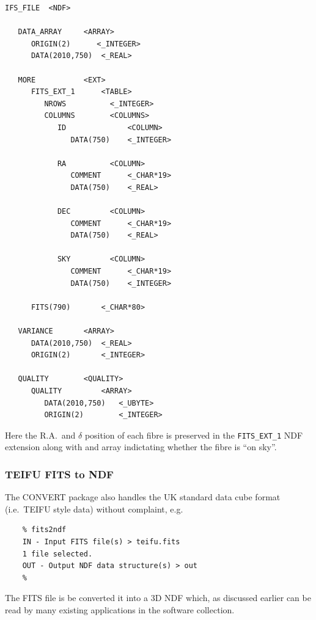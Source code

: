 \documentclass[twoside,11pt]{article}
\newcommand{\htmlref}[2]{#1}
\newcommand{\xref}[3]{#1}
\begin{document}
\small\begin{verbatim}
IFS_FILE  <NDF>

   DATA_ARRAY     <ARRAY>          
      ORIGIN(2)      <_INTEGER>  
      DATA(2010,750)  <_REAL> 

   MORE           <EXT>           
      FITS_EXT_1      <TABLE>         
         NROWS          <_INTEGER>    
         COLUMNS        <COLUMNS>      
            ID              <COLUMN>        
               DATA(750)    <_INTEGER>     

            RA          <COLUMN>        
               COMMENT      <_CHAR*19>    
               DATA(750)    <_REAL> 

            DEC         <COLUMN>        
               COMMENT      <_CHAR*19>      
               DATA(750)    <_REAL>         

            SKY         <COLUMN>   
               COMMENT      <_CHAR*19>  
               DATA(750)    <_INTEGER> 

      FITS(790)       <_CHAR*80> 

   VARIANCE       <ARRAY>        
      DATA(2010,750)  <_REAL>   
      ORIGIN(2)       <_INTEGER> 

   QUALITY        <QUALITY>    
      QUALITY         <ARRAY>    
         DATA(2010,750)   <_UBYTE>   
         ORIGIN(2)        <_INTEGER> 
\end{verbatim}\normalsize

Here the R.A.\ and $\delta$ position of each fibre is preserved in the {\tt FITS\_EXT\_1} NDF extension along with and array indictating whether the fibre is ``on sky''.

\subsubsection{TEIFU FITS to NDF}

The \xref{CONVERT}{sun55}{} package also handles the UK standard data cube format (i.e.\ TEIFU style data) without complaint, e.g.\

\begin{verbatim}
    % fits2ndf
    IN - Input FITS file(s) > teifu.fits
    1 file selected.
    OUT - Output NDF data structure(s) > out
    % 
\end{verbatim}

The FITS file is be converted it into a 3D NDF which, as \htmlref{discussed earlier}{sc16_teifufile} can be read by many existing applications in the software collection.
\end{document}

